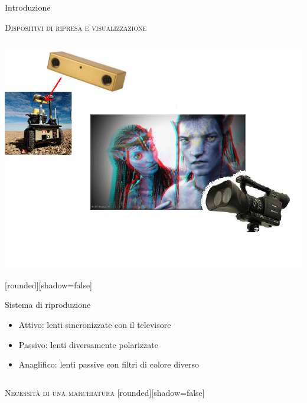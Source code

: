 \documentclass{beamer}
\begin{document}
\begin{section}{Introduzione}
\begin{frame}[t]{\textsc{Dispositivi di ripresa e visualizzazione}}
\begin{columns}
\begin{column}{5cm}
\centering
\vspace{0.7em}
\includegraphics[width=1\linewidth]{./img/camere.png}
\vspace{-2.8em}
\begin{center}
[rounded][shadow=false]
\begin{block}{Sistema di riproduzione}
		\begin{itemize}
			\item  \small{Attivo: lenti sincronizzate con il televisore}
			\item \small{Passivo: lenti diversamente polarizzate}
			\item \small{Anaglifico: lenti passive con filtri di colore diverso}
		\end{itemize}	
	\end{block}
\end{center}
\end{column}
\end{columns}
\end{frame}








\begin{frame}[t]{\textsc{Necessit\`{a} di una marchiatura}}
	[rounded][shadow=false]


\end{frame}
\end{section}
\end{document}
